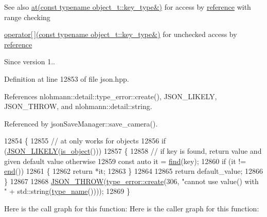 \begin{DoxySeeAlso}{See also}
\hyperlink{classnlohmann_1_1basic__json_a93403e803947b86f4da2d1fb3345cf2c}{at(const typename object\+\_\+t\+::key\+\_\+type\&)} for access by \hyperlink{classnlohmann_1_1basic__json_ac6a5eddd156c776ac75ff54cfe54a5bc}{reference} with range checking 

\hyperlink{classnlohmann_1_1basic__json_a233b02b0839ef798942dd46157cc0fe6}{operator\mbox{[}$\,$\mbox{]}(const typename object\+\_\+t\+::key\+\_\+type\&)} for unchecked access by \hyperlink{classnlohmann_1_1basic__json_ac6a5eddd156c776ac75ff54cfe54a5bc}{reference}
\end{DoxySeeAlso}
\begin{DoxySince}{Since}
version 1.. 
\end{DoxySince}


Definition at line 12853 of file json.\+hpp.



References nlohmann\+::detail\+::type\+\_\+error\+::create(), J\+S\+O\+N\+\_\+\+L\+I\+K\+E\+LY, J\+S\+O\+N\+\_\+\+T\+H\+R\+OW, and nlohmann\+::detail\+::string.



Referenced by json\+Save\+Manager\+::save\+\_\+camera().


\begin{DoxyCode}
12854     \{
12855         \textcolor{comment}{// at only works for objects}
12856         \textcolor{keywordflow}{if} (\hyperlink{json_8hpp_a41ecd1c4cf7c3d56477b9b685b5daa72}{JSON\_LIKELY}(\hyperlink{classnlohmann_1_1basic__json_af8f511af124e82e4579f444b4175787c}{is\_object}()))
12857         \{
12858             \textcolor{comment}{// if key is found, return value and given default value otherwise}
12859             \textcolor{keyword}{const} \textcolor{keyword}{auto} it = \hyperlink{classnlohmann_1_1basic__json_a89eb3928f57903677051c80534be9cb1}{find}(key);
12860             \textcolor{keywordflow}{if} (it != \hyperlink{classnlohmann_1_1basic__json_a13e032a02a7fd8a93fdddc2fcbc4763c}{end}())
12861             \{
12862                 \textcolor{keywordflow}{return} *it;
12863             \}
12864 
12865             \textcolor{keywordflow}{return} default\_value;
12866         \}
12867 
12868         \hyperlink{json_8hpp_a6c274f6db2e65c1b66c7d41b06ad690f}{JSON\_THROW}(\hyperlink{classnlohmann_1_1detail_1_1type__error_aecc083aea4b698c33d042670ba50c10f}{type\_error::create}(306, \textcolor{stringliteral}{"cannot use value() with "} + 
      std::string(\hyperlink{classnlohmann_1_1basic__json_a9d0a478571f82f0163b96b2424cd998f}{type\_name}())));
12869     \}
\end{DoxyCode}
Here is the call graph for this function\+:
Here is the caller graph for this function\+:
\mbox{\label{classnlohmann_1_1basic__json_ad6a18403e7fbac9c4efd06facc71fc88}} 
